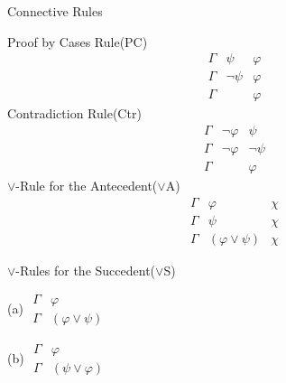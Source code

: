 \documentclass{article}
\begin{document}
\begin{freebox}{Connective Rules}
    \begin{multicols}{2}
    Proof by Cases Rule(PC)
        \[
            \begin{array}{ccc}
                \Gamma & \psi & \varphi \\
                \Gamma & \lnot \psi & \varphi \\
                \hline
                \Gamma & & \varphi
            \end{array}
        \]
    Contradiction Rule(Ctr)
        \[
            \begin{array}{ccc}
                \Gamma & \lnot \varphi & \psi \\
                \Gamma & \lnot \varphi & \lnot \psi \\   
                \hline
                \Gamma & & \varphi
            \end{array}
        \]
    $\lor$-Rule for the Antecedent($\lor$A)
        \[
            \begin{array}{ccc}
                \Gamma & \varphi & \chi \\
                \Gamma & \psi & \chi \\
                \hline
                \Gamma & (\varphi \lor \psi) & \chi 
            \end{array}
        \]
    \end{multicols}        

    $\lor$-Rules for the Succedent($\lor$S)
        \begin{multicols}{2}
            (a) 
            $
            \begin{array}{cc}
                \Gamma & \varphi \\
                \hline
                \Gamma & (\varphi \lor \psi)
            \end{array}
            $   

        \columnbreak    

            (b) 
            $
            \begin{array}{cc}
                \Gamma & \varphi \\
                \hline
                \Gamma & (\psi \lor \varphi)
            \end{array}
            $   
        \end{multicols}

\end{freebox}
\end{document}
